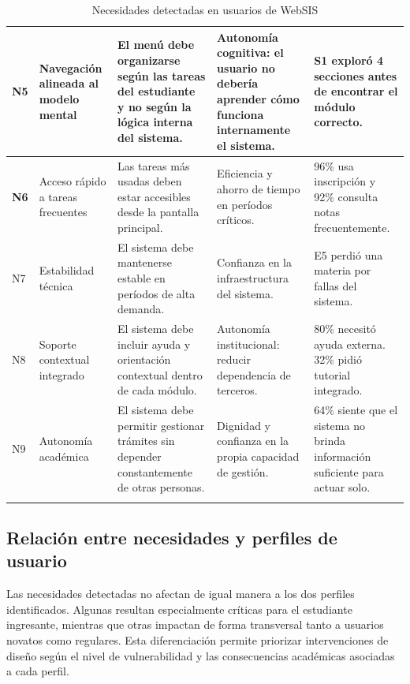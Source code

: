 {\begin{longtable}{|>{\bfseries}p{0.6cm}|p{2.6cm}|p{4.1cm}|p{3.7cm}|p{3.7cm}|}
N5 & Navegación alineada al modelo mental & El menú debe organizarse según las tareas del estudiante y no según la lógica interna del sistema. & Autonomía cognitiva: el usuario no debería aprender cómo funciona internamente el sistema. & S1 exploró 4 secciones antes de encontrar el módulo correcto. \\
\hline

N6 & Acceso rápido a tareas frecuentes & Las tareas más usadas deben estar accesibles desde la pantalla principal. & Eficiencia y ahorro de tiempo en períodos críticos. & 96\% usa inscripción y 92\% consulta notas frecuentemente. \\
\hline

N7 & Estabilidad técnica & El sistema debe mantenerse estable en períodos de alta demanda. & Confianza en la infraestructura del sistema. & E5 perdió una materia por fallas del sistema. \\
\hline

N8 & Soporte contextual integrado & El sistema debe incluir ayuda y orientación contextual dentro de cada módulo. & Autonomía institucional: reducir dependencia de terceros. & 80\% necesitó ayuda externa. 32\% pidió tutorial integrado. \\
\hline

N9 & Autonomía académica & El sistema debe permitir gestionar trámites sin depender constantemente de otras personas. & Dignidad y confianza en la propia capacidad de gestión. & 64\% siente que el sistema no brinda información suficiente para actuar solo. \\
\hline

\caption{Necesidades detectadas en usuarios de WebSIS}
\label{tab:necesidades-detectadas}
\end{longtable}
}
\subsection {Relación entre necesidades y perfiles de usuario}

Las necesidades detectadas no afectan de igual manera a los dos perfiles identificados. Algunas resultan especialmente críticas para el estudiante ingresante, mientras que otras impactan de forma transversal tanto a usuarios novatos como regulares. Esta diferenciación permite priorizar intervenciones de diseño según el nivel de vulnerabilidad y las consecuencias académicas asociadas a cada perfil.

